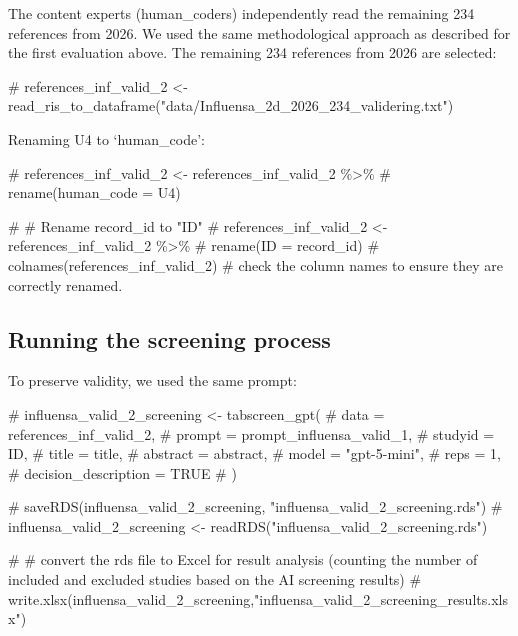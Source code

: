 \documentclass[
  letterpaper,
  DIV=11,
  numbers=noendperiod]{scrartcl}
\newenvironment{Shaded}{\begin{snugshade}}{\end{snugshade}}
\newcommand{\CommentTok}[1]{\textcolor[rgb]{0.37,0.37,0.37}{#1}}
\begin{document}
The content experts (human\_coders) independently read the remaining 234
references from 2026. We used the same methodological approach as
described for the first evaluation above. The remaining 234 references
from 2026 are selected:

\begin{Shaded}
\begin{Highlighting}[]
\CommentTok{\# references\_inf\_valid\_2 \textless{}{-} read\_ris\_to\_dataframe("data/Influensa\_2d\_2026\_234\_validering.txt")}
\end{Highlighting}
\end{Shaded}

Renaming U4 to `human\_code':

\begin{Shaded}
\begin{Highlighting}[]
\CommentTok{\# references\_inf\_valid\_2 \textless{}{-} references\_inf\_valid\_2 \%\textgreater{}\% }
\CommentTok{\#   rename(human\_code = U4)}

\CommentTok{\#   \# Rename record\_id to "ID"}
\CommentTok{\# references\_inf\_valid\_2 \textless{}{-} references\_inf\_valid\_2 \%\textgreater{}\%}
\CommentTok{\#   rename(ID = record\_id)}
\CommentTok{\# colnames(references\_inf\_valid\_2) \# check the column names to ensure they are correctly renamed.}
\end{Highlighting}
\end{Shaded}

\subsection{Running the screening
process}\label{running-the-screening-process-1}

To preserve validity, we used the same prompt:

\begin{Shaded}
\begin{Highlighting}[]
\CommentTok{\# influensa\_valid\_2\_screening \textless{}{-}  tabscreen\_gpt(}
\CommentTok{\#   data = references\_inf\_valid\_2,}
\CommentTok{\#   prompt = prompt\_influensa\_valid\_1,}
\CommentTok{\#   studyid = ID,}
\CommentTok{\#   title = title,}
\CommentTok{\#   abstract = abstract,}
\CommentTok{\#   model = "gpt{-}5{-}mini",}
\CommentTok{\#   reps = 1,}
\CommentTok{\#   decision\_description = TRUE}
\CommentTok{\# )}

\CommentTok{\# saveRDS(influensa\_valid\_2\_screening, "influensa\_valid\_2\_screening.rds")}
\CommentTok{\# influensa\_valid\_2\_screening \textless{}{-} readRDS("influensa\_valid\_2\_screening.rds")}

\CommentTok{\# \# convert the rds file to Excel for result analysis (counting the number of included and excluded studies based on the AI screening results)}
\CommentTok{\# write.xlsx(influensa\_valid\_2\_screening,"influensa\_valid\_2\_screening\_results.xlsx")}
\end{Highlighting}
\end{Shaded}
\end{document}
